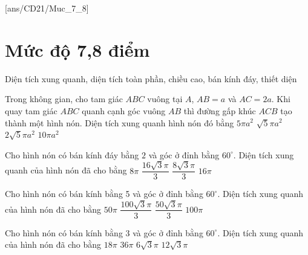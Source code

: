 [ans/CD21/Muc_7_8]
\setcounter{ex}{0}
\setcounter{dang}{0}
\section{Mức độ 7,8 điểm}
\begin{dang}
	{Diện tích xung quanh, diện tích toàn phần, chiều cao, bán kính đáy, thiết diện}
\end{dang}
\begin{ex}
	Trong không gian, cho tam giác $ABC$ vuông tại $A$, $AB=a$ và $AC=2a$. Khi quay tam giác $ABC$ quanh cạnh góc vuông $AB$ thì đường gấp khúc $ACB$ tạo thành một hình nón. Diện tích xung quanh hình nón đó bằng
	\choice
	{$5\pi a^2$}
	{$\sqrt{5}\pi a^2$}
	{\True $2\sqrt{5}\pi a^2$}
	{$10\pi a^2$}
\end{ex}
\begin{ex}
	[Mã 101 - 2020 Lần 1]%
	Cho hình nón có bán kính đáy bằng $2$ và góc ở đỉnh bằng $60^{\circ}$. Diện tích xung quanh của hình nón đã cho bằng
	\choice
	{\True $8\pi$}
	{$\dfrac{16\sqrt{3}\pi}{3}$}
	{$\dfrac{8\sqrt{3}\pi}{3}$}
	{$16\pi$}
\end{ex}
\begin{ex}
	[Mã 102 - 2020 Lần 1]%
	Cho hình nón có bán kính bằng 5 và góc ở đỉnh bằng $60^{\circ}$. Diện tích xung quanh của hình nón đã cho bằng
	\choice
	{\True $50 \pi$}
	{$\dfrac{100 \sqrt{3}\pi}{3}$}
	{$\dfrac{50 \sqrt{3}\pi}{3}$}
	{$100 \pi$}
\end{ex}
\begin{ex}
	[Mã 103 - 2020 Lần 1]%
	Cho hình nón có bán kính bằng 3 và góc ở đỉnh bằng $60^{\circ}$. Diện tích xung quanh của hình nón đã cho bằng
	\choice
	{\True $18\pi$}
	{$36\pi$}
	{$6\sqrt{3}\pi$}
	{$12\sqrt{3}\pi$}
\end{ex}
